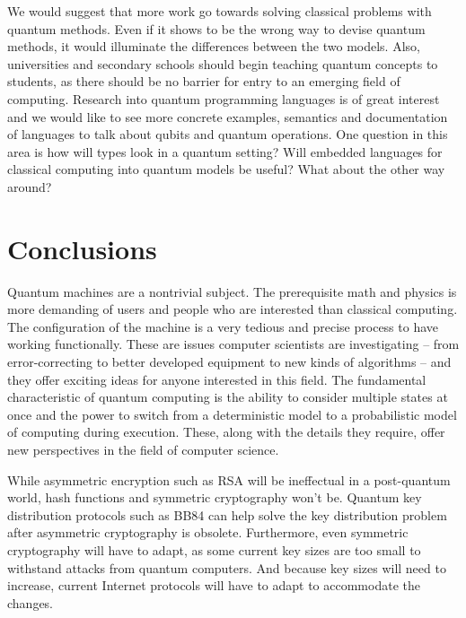\documentclass[11pt]{article}
\begin{document}
We would suggest that more work go towards solving classical problems with quantum methods.
Even if it shows to be the wrong way to devise quantum methods, it would illuminate the differences between the two models.
Also, universities and secondary schools should begin teaching quantum concepts to students, as
there should be no barrier for entry to an emerging field of computing.
Research into quantum programming languages is of great interest and we
would like to see more concrete examples, semantics and documentation of languages
to talk about qubits and quantum operations. One question in this area
is how will types look in a quantum setting? Will embedded languages for classical computing into quantum models be useful? What about the other way around?


\section{Conclusions}


Quantum machines are a nontrivial subject. The prerequisite math and physics is more
demanding of users and people who are interested than classical computing. The
configuration of the machine is a very tedious and precise process to have working functionally.
These are issues computer scientists are investigating -- from error-correcting to better developed
equipment to new kinds of algorithms -- and they offer exciting ideas for anyone interested in this field.
The fundamental characteristic of quantum computing is the ability to consider multiple states at once and the
power to switch from a deterministic model to a probabilistic model of computing during
execution.
These, along with the details they require, offer new perspectives in the field
of computer science. 

While asymmetric encryption such as RSA will be ineffectual in a post-quantum world, hash functions and symmetric cryptography won't be.
Quantum key distribution protocols such as BB84 can help solve the key distribution
problem after asymmetric cryptography is obsolete.
Furthermore, even symmetric cryptography will have to adapt, as some current key sizes are too small to withstand attacks from quantum computers. And because key sizes will need to increase, current Internet protocols will have to adapt to accommodate the changes. 
\end{document}
